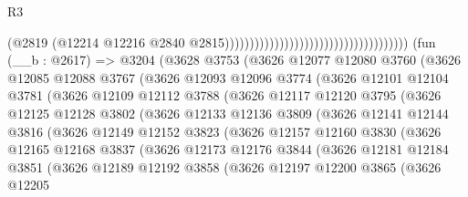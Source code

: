 \begin{lexlean}{R3}
\begin{coremodule}
                                                                          (@2819
                                                                            (@12214
                                                                              @12216
                                                                              @2840
                                                                              @2815)))))))))))))))))))))))))))))))))))))
    (fun (__b : @2617) =>
    @3204
      (@3628
        @3753
        (@3626
          @12077
          @12080
          @3760
          (@3626
            @12085
            @12088
            @3767
            (@3626
              @12093
              @12096
              @3774
              (@3626
                @12101
                @12104
                @3781
                (@3626
                  @12109
                  @12112
                  @3788
                  (@3626
                    @12117
                    @12120
                    @3795
                    (@3626
                      @12125
                      @12128
                      @3802
                      (@3626
                        @12133
                        @12136
                        @3809
                        (@3626
                          @12141
                          @12144
                          @3816
                          (@3626
                            @12149
                            @12152
                            @3823
                            (@3626
                              @12157
                              @12160
                              @3830
                              (@3626
                                @12165
                                @12168
                                @3837
                                (@3626
                                  @12173
                                  @12176
                                  @3844
                                  (@3626
                                    @12181
                                    @12184
                                    @3851
                                    (@3626
                                      @12189
                                      @12192
                                      @3858
                                      (@3626
                                        @12197
                                        @12200
                                        @3865
                                        (@3626
                                          @12205

\end{coremodule}
\end{lexlean}
